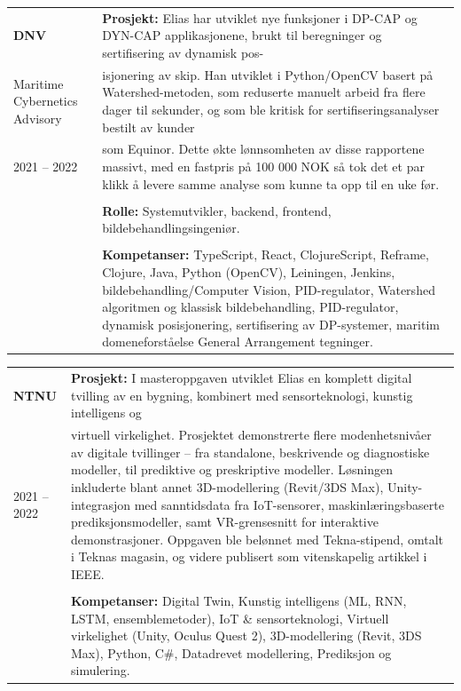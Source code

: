 \documentclass[a4paper,10pt]{article}
\begin{document}
\vspace{2em}

\noindent
\begin{longtable}{@{}p{4cm}p{11cm}@{}}  %
\textbf{DNV} 
& \textbf{Prosjekt:} Elias har utviklet nye funksjoner i DP-CAP og DYN-CAP applikasjonene, brukt til beregninger og sertifisering av dynamisk pos-\\
Maritime Cybernetics Advisory & isjonering av skip. Han utviklet i Python/OpenCV basert på Watershed-metoden, som reduserte manuelt arbeid fra flere dager til sekunder, og som ble kritisk for sertifiseringsanalyser bestilt av kunder\\
2021 -- 2022 & som Equinor. Dette økte lønnsomheten av disse rapportene massivt, med en fastpris på 100 000 NOK så tok det et par klikk å levere samme analyse som kunne ta opp til en uke før. \\
& \\
& \textbf{Rolle:} Systemutvikler, backend, frontend, bildebehandlingsingeniør. \\
& \\
& \textbf{Kompetanser:} TypeScript, React, ClojureScript, Reframe, Clojure, Java, Python (OpenCV), Leiningen, Jenkins, bildebehandling/Computer Vision, PID-regulator, Watershed algoritmen og klassisk bildebehandling, PID-regulator, dynamisk posisjonering, sertifisering av DP-systemer, maritim domeneforståelse General Arrangement tegninger. \\
\end{longtable}


\vspace{2em}

\noindent
\begin{longtable}{@{}p{4cm}p{11cm}@{}}  %
\textbf{NTNU} 
& \textbf{Prosjekt:} I masteroppgaven utviklet Elias en komplett digital tvilling av en bygning, kombinert med sensorteknologi, kunstig intelligens og \\
2021 -- 2022  & virtuell virkelighet. Prosjektet demonstrerte flere modenhetsnivåer av digitale tvillinger – fra standalone, beskrivende og diagnostiske modeller, til prediktive og preskriptive modeller. Løsningen inkluderte blant annet 3D-modellering (Revit/3DS Max), Unity-integrasjon med sanntidsdata fra IoT-sensorer, maskinlæringsbaserte prediksjonsmodeller, samt VR-grensesnitt for interaktive demonstrasjoner. Oppgaven ble belønnet med Tekna-stipend, omtalt i Teknas magasin, og videre publisert som vitenskapelig artikkel i IEEE. \\
& \\
& \textbf{Kompetanser:} Digital Twin, Kunstig intelligens (ML, RNN, LSTM, ensemblemetoder), IoT \& sensorteknologi, Virtuell virkelighet (Unity, Oculus Quest 2), 3D-modellering (Revit, 3DS Max), Python, C\#, Datadrevet modellering, Prediksjon og simulering. \\
\end{longtable}
 


 
\end{document}
